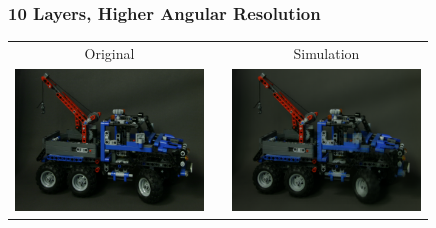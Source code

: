 \documentclass[12pt, compress]{beamer}
\begin{document}
\begin{frame}[fragile]
	\frametitle{10 Layers, Higher Angular Resolution}
	
	\begin{center}
		\begin{tabular}{c p{0cm} c}
			Original & & Simulation \\
			\includegraphics[width = 5cm, trim={15cm, 10cm, 15cm, 10cm}, clip]{images/layers_and_projections/legotruck/original/08_08}
			& & \includegraphics[width = 5cm, trim={7.5cm, 5cm, 7.5cm, 5cm}, clip]{figures/simulated_views/legotruck/10_Layers_9x9_angular/Reconstruction_of_view_(5,5)}
		\end{tabular}
	\end{center}
\end{frame}
\end{document}
